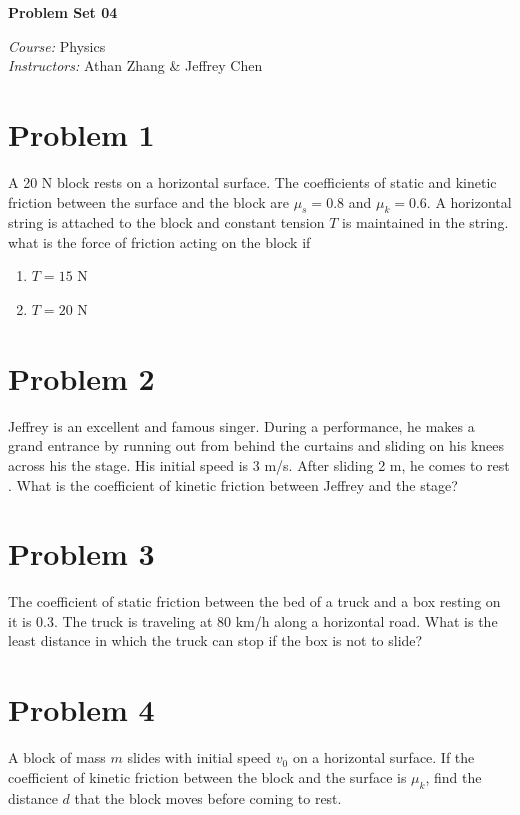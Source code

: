 \documentclass[tikz,border=10pt]{article}
\newcommand{\course}{Physics}
\newcommand{\instructor}{Athan Zhang \& Jeffrey Chen}
\begin{document}
\begin{center}
\textbf{\Huge Problem Set 04} %
\end{center}

\begin{flushleft}
\emph{Course:} \course \\
\emph{Instructors:} \instructor \\
\end{flushleft}

\section*{Problem 1}

A 20 N block rests on a horizontal surface. The coefficients of static and kinetic friction between the surface and the block are $\mu_s = 0.8$ and $\mu_k = 0.6$. A horizontal string is attached to the block and constant tension $T$ is maintained in the string. what is the force of friction acting on the block if
\begin{enumerate}
    \item $T = 15$ N
    \item $T = 20$ N
\end{enumerate}

\section*{Problem 2}
Jeffrey is an excellent and famous singer. During a performance, he makes a grand entrance by running out from behind the curtains and sliding on his knees across his the stage. His initial speed is 3 m/s. After sliding 2 m, he comes to rest . What is the coefficient of kinetic friction between Jeffrey and the stage?

\section*{Problem 3}
The coefficient of static friction between the bed of a truck and a box resting on it is 0.3. The truck is traveling at 80 km/h along a horizontal road. What is the least distance in which the truck can stop if the box is not to slide?

\section*{Problem 4}
A block of mass $m$ slides with initial speed $v_0$ on a horizontal surface. If the coefficient of kinetic friction between the block and the surface is $\mu_k$, find the distance $d$ that the block moves before coming to rest.
\end{document}
